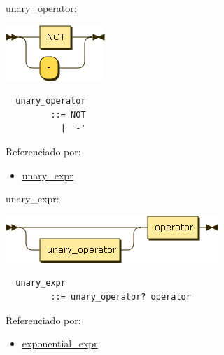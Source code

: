 \begin{minipage}{\textwidth}
  \protect\hypertarget{unary_operator}{}{unary\_operator:}

  \includegraphics[width=1.47917in,height=0.83333in]{diagram/unary_operator.png}

  \begin{verbatim}
  unary_operator
         ::= NOT
           | '-'
  \end{verbatim}

  Referenciado por:

  \begin{itemize}
      \tightlist%
    \item
      \protect\hyperlink{unary_expr}{unary\_expr}
  \end{itemize}

\end{minipage}

\begin{minipage}{\textwidth}
  \protect\hypertarget{unary_expr}{}{unary\_expr:}

  \includegraphics[width=3.16667in,height=0.70833in]{diagram/unary_expr.png}

  \begin{verbatim}
  unary_expr
         ::= unary_operator? operator
  \end{verbatim}

  Referenciado por:

  \begin{itemize}
      \tightlist%
    \item
      \protect\hyperlink{exponential_expr}{exponential\_expr}
  \end{itemize}

\end{minipage}


